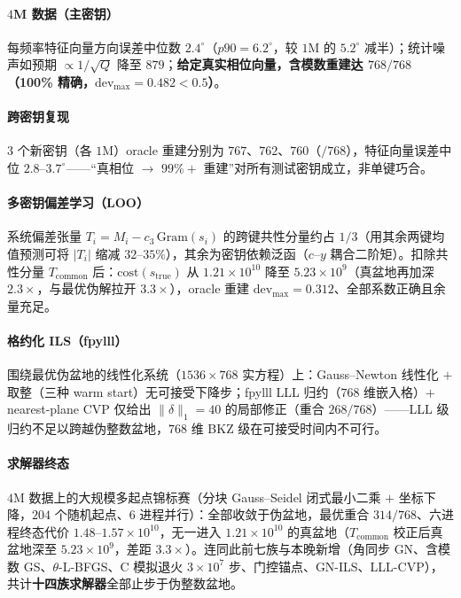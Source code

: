 \documentclass[11pt,a4paper]{ctexart}
\begin{document}
\paragraph{$4$M 数据（主密钥）} 每频率特征向量方向误差中位数 $2.4^\circ$（$p90=6.2^\circ$，较 $1$M 的 $5.2^\circ$ 减半）；统计噪声如预期 $\propto 1/\sqrt Q$ 降至 $879$；\textbf{给定真实相位向量，含模数重建达 $768/768$（100\% 精确，$\mathrm{dev}_{\max}=0.482<0.5$）}。

\paragraph{跨密钥复现} $3$ 个新密钥（各 $1$M）oracle 重建分别为 $767$、$762$、$760$（$/768$），特征向量误差中位 $2.8$--$3.7^\circ$——``真相位 $\to$ $99\%+$ 重建''对所有测试密钥成立，非单键巧合。

\paragraph{多密钥偏差学习（LOO）} 系统偏差张量 $T_i=M_i-c_3\,\mathrm{Gram}(s_i)$ 的跨键共性分量约占 $1/3$（用其余两键均值预测可将 $|T_i|$ 缩减 $32$--$35\%$），其余为密钥依赖泛函（$c$--$y$ 耦合二阶矩）。扣除共性分量 $T_{\mathrm{common}}$ 后：$\mathrm{cost}(s_{\text{true}})$ 从 $1.21\times10^{10}$ 降至 $5.23\times10^9$（真盆地再加深 $2.3\times$，与最优伪解拉开 $3.3\times$），oracle 重建 $\mathrm{dev}_{\max}=0.312$、全部系数正确且余量充足。

\paragraph{格约化 ILS（fpylll）} 围绕最优伪盆地的线性化系统（$1536\times768$ 实方程）上：Gauss--Newton 线性化 $+$ 取整（三种 warm start）无可接受下降步；fpylll LLL 归约（$768$ 维嵌入格）$+$ nearest-plane CVP 仅给出 $\|\delta\|_1=40$ 的局部修正（重合 $268/768$）——LLL 级归约不足以跨越伪整数盆地，$768$ 维 BKZ 级在可接受时间内不可行。

\paragraph{求解器终态} $4$M 数据上的大规模多起点锦标赛（分块 Gauss--Seidel 闭式最小二乘 $+$ 坐标下降，$204$ 个随机起点、6 进程并行）：全部收敛于伪盆地，最优重合 $314/768$、六进程终态代价 $1.48$--$1.57\times10^{10}$，无一进入 $1.21\times10^{10}$ 的真盆地（$T_{\mathrm{common}}$ 校正后真盆地深至 $5.23\times10^9$，差距 $3.3\times$）。连同此前七族与本晚新增（角同步 GN、含模数 GS、$\theta$-L-BFGS、C 模拟退火 $3\times10^7$ 步、门控锚点、GN-ILS、LLL-CVP），共计\textbf{十四族求解器}全部止步于伪整数盆地。
\end{document}
